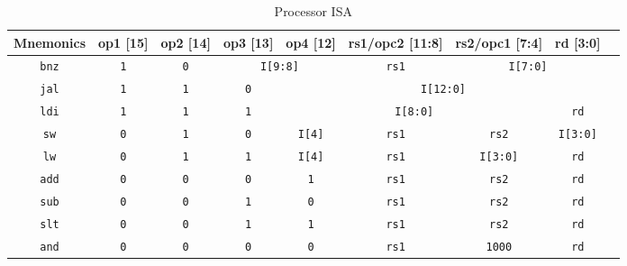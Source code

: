 \documentclass[a4paper]{article}
\begin{document}
\begin{table}[!h]
\centering
\caption{Processor ISA}
\begin{tabular}{c c c c c c c c c}
\textbf{Mnemonics} & \textbf{op1} [15] & \textbf{op2} [14] & \textbf{op3} [13] & \textbf{op4} [12] & \textbf{rs1/opc2} [11:8] & \textbf{rs2/opc1} [7:4] & \textbf{rd} [3:0] \\ \hline \hline

\multicolumn{1}{|c|}{\texttt{bnz}} & \texttt{1} & \texttt{0} & \multicolumn{2}{|c}{\texttt{I[9:8]}} & \multicolumn{1}{|c}{\texttt{rs1}} & \multicolumn{2}{|c|}{\texttt{I[7:0]}}\\ \hline

\multicolumn{1}{|c|}{\texttt{jal}} & \texttt{1} & \texttt{1} & \texttt{0}  & \multicolumn{4}{|c|}{\texttt{I[12:0]}} \\ \hline

\multicolumn{1}{|c|}{\texttt{ldi}} & \texttt{1} & \texttt{1} & \texttt{1} & \multicolumn{3}{|c}{\texttt{I[8:0]}} & \multicolumn{1}{|c|}{\texttt{rd}}\\ \hline\hline

\multicolumn{1}{|c|}{\texttt{sw}} & \texttt{0} & \texttt{1} & \texttt{0} & \multicolumn{1}{|c}{\texttt{I[4]}} & \multicolumn{1}{|c|}{\texttt{rs1}} & \texttt{rs2} & \multicolumn{1}{|c|}{\texttt{I[3:0]}}\\ \hline

\multicolumn{1}{|c|}{\texttt{lw}} & \texttt{0} & \texttt{1} & \texttt{1} & \multicolumn{1}{|c}{\texttt{I[4]}} & \multicolumn{1}{|c|}{\texttt{rs1}} & \texttt{I[3:0]} & \multicolumn{1}{|c|}{\texttt{rd}}\\ \hline\hline

\multicolumn{1}{|c|}{\texttt{add}} & \texttt{0} & \texttt{0} & \texttt{0} & \texttt{1} & \multicolumn{1}{|c|}{\texttt{rs1}} & \texttt{rs2} & \multicolumn{1}{|c|}{\texttt{rd}} \\ \hline

\multicolumn{1}{|c|}{\texttt{sub}} & \texttt{0} & \texttt{0} & \texttt{1} & \texttt{0} & \multicolumn{1}{|c|}{\texttt{rs1}} & \texttt{rs2} & \multicolumn{1}{|c|}{\texttt{rd}} \\ \hline

\multicolumn{1}{|c|}{\texttt{slt}} & \texttt{0} & \texttt{0} & \texttt{1} & \texttt{1} & \multicolumn{1}{|c|}{\texttt{rs1}} & \texttt{rs2} & \multicolumn{1}{|c|}{\texttt{rd}} \\ \hline \hline

\multicolumn{1}{|c|}{\texttt{and}} & \texttt{0} & \texttt{0} & \texttt{0} & \texttt{0} & \multicolumn{1}{|c|}{\texttt{rs1}} & \texttt{1000} & \multicolumn{1}{|c|}{\texttt{rd}}  \\ \hline


\end{tabular}
\end{table}
\end{document}
